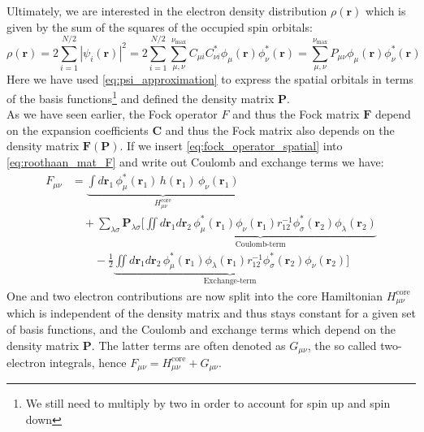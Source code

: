 Ultimately, we are interested in the electron density distribution $\rho(\mathbf{r})$ which is given by the sum of the squares of the occupied spin orbitals: 
\begin{equation}
    \rho(\mathbf{r}) = 2 \sum_{i=1}^{N/2} |\psi_i(\mathbf{r})|^2 = 2 \sum_{i=1}^{N/2} \sum_{\mu,\nu}^{\nu_\text{max}} C_{\mu i} C_{\nu i}^* \phi_\mu(\mathbf{r}) \phi_\nu^*(\mathbf{r}) = \sum_{\mu,\nu}^{\nu_\text{max}} P_{\mu \nu} \phi_\mu(\mathbf{r}) \phi_\nu^*(\mathbf{r})
\end{equation}
Here we have used \autoref{eq:psi_approximation} to express the spatial orbitals in terms of the basis functions\footnote{We still need to multiply by two in order to account for spin up and spin down} and defined the density matrix $\mathbf{P}$.\\
As we have seen earlier, the Fock operator $F$ and thus the Fock matrix $\mathbf{F}$ depend on the expansion coefficients $\mathbf{C}$ and thus the Fock matrix also depends on the density matrix $\mathbf{F(P)}$. If we insert \autoref{eq:fock_operator_spatial} into \autoref{eq:roothaan_mat_F} and write out Coulomb and exchange terms we have: 
\begin{align}
    \label{eq:fock_full_eq_coul_ex}
        F_{\mu \nu} &= \underbrace{\int d\mathbf{r}_1\, \phi_\mu^*(\mathbf{r}_1)\, h(\mathbf{r}_1)\, \phi_\nu(\mathbf{r}_1) \nonumber}_{H_{\mu\nu}^\text{core}} \\
        &\quad + \sum_{\lambda \sigma} \mathbf{P}_{\lambda \sigma} \Bigg[
            \underbrace{\iint  d\mathbf{r}_1 d\mathbf{r}_2\, \phi_\mu^*(\mathbf{r}_1) \phi_\nu(\mathbf{r}_1) r_{12}^{-1} \phi_\sigma^*(\mathbf{r}_2) \phi_\lambda(\mathbf{r}_2) \nonumber}_{\text{Coulomb-term}} \\
            &\qquad - \frac{1}{2} \underbrace{\iint d\mathbf{r}_1 d\mathbf{r}_2\, \phi_\mu^*(\mathbf{r}_1) \phi_\lambda(\mathbf{r}_1) r_{12}^{-1} \phi_\sigma^*(\mathbf{r}_2) \phi_\nu(\mathbf{r}_2)}_{\text{Exchange-term}}
            \Bigg]
\end{align}
One and two electron contributions are now split into the core Hamiltonian $H_{\mu\nu}^\text{core}$ which is independent of the density matrix and thus stays constant for a given set of basis functions, and the Coulomb and exchange terms which depend on the density matrix $\mathbf{P}$. The latter terms are often denoted as $G_{\mu\nu}$, the so called two-electron integrals, hence $F_{\mu \nu} = H_{\mu\nu}^\text{core} + G_{\mu\nu}$.\\

